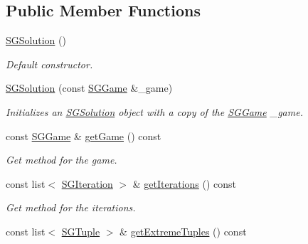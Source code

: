 \subsection*{Public Member Functions}
\begin{DoxyCompactItemize}
\item 
\mbox{\label{classSGSolution_a7f5f0bc77731b7e580f64cb3895caf23}} 
\hyperlink{classSGSolution_a7f5f0bc77731b7e580f64cb3895caf23}{S\+G\+Solution} ()
\begin{DoxyCompactList}\small\item\em Default constructor. \end{DoxyCompactList}\item 
\mbox{\label{classSGSolution_abea915fbaf1424b6c6fa745e2d844d07}} 
\hyperlink{classSGSolution_abea915fbaf1424b6c6fa745e2d844d07}{S\+G\+Solution} (const \hyperlink{classSGGame}{S\+G\+Game} \&\+\_\+game)
\begin{DoxyCompactList}\small\item\em Initializes an \hyperlink{classSGSolution}{S\+G\+Solution} object with a copy of the \hyperlink{classSGGame}{S\+G\+Game} \+\_\+game. \end{DoxyCompactList}\item 
\mbox{\label{classSGSolution_a8a7f3ea2ca21d33220a6f0858adca6b8}} 
const \hyperlink{classSGGame}{S\+G\+Game} \& \hyperlink{classSGSolution_a8a7f3ea2ca21d33220a6f0858adca6b8}{get\+Game} () const
\begin{DoxyCompactList}\small\item\em Get method for the game. \end{DoxyCompactList}\item 
\mbox{\label{classSGSolution_a4295df8b2e6715d62c8c769ba1202bdd}} 
const list$<$ \hyperlink{classSGIteration}{S\+G\+Iteration} $>$ \& \hyperlink{classSGSolution_a4295df8b2e6715d62c8c769ba1202bdd}{get\+Iterations} () const
\begin{DoxyCompactList}\small\item\em Get method for the iterations. \end{DoxyCompactList}\item 
\mbox{\label{classSGSolution_a9ba0f1e37762d4b754cef2c9d4e74c3f}} 
const list$<$ \hyperlink{classSGTuple}{S\+G\+Tuple} $>$ \& \hyperlink{classSGSolution_a9ba0f1e37762d4b754cef2c9d4e74c3f}{get\+Extreme\+Tuples} () const

\end{DoxyCompactItemize}
